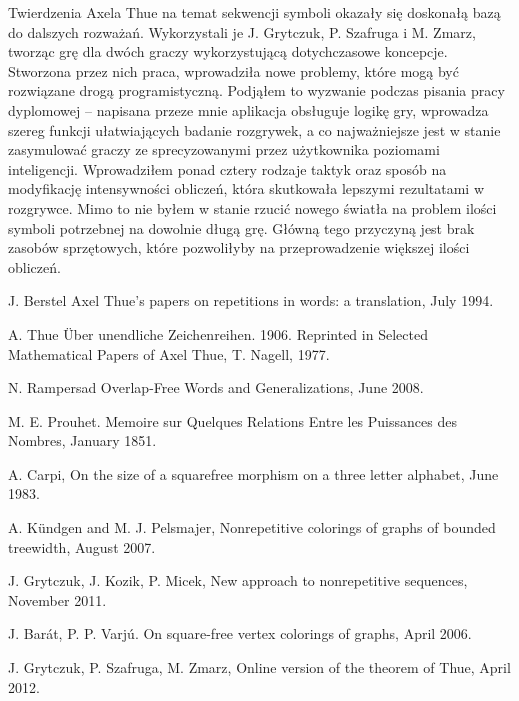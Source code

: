 \documentclass[document]{xmgr}
\begin{document}
\summary
Twierdzenia Axela Thue na temat sekwencji symboli okazały się doskonałą bazą do dalszych rozważań. Wykorzystali je J. Grytczuk, P. Szafruga i M. Zmarz, tworząc grę dla dwóch graczy wykorzystującą dotychczasowe koncepcje. Stworzona przez nich praca, wprowadziła nowe problemy, które mogą być rozwiązane drogą programistyczną. Podjąłem to wyzwanie podczas pisania pracy dyplomowej -- napisana przeze mnie aplikacja obsługuje logikę gry, wprowadza szereg funkcji ułatwiających badanie rozgrywek, a co najważniejsze jest w stanie zasymulować graczy ze sprecyzowanymi przez użytkownika poziomami inteligencji. Wprowadziłem ponad cztery rodzaje taktyk oraz sposób na modyfikację intensywności obliczeń, która skutkowała lepszymi rezultatami w rozgrywce. Mimo to nie byłem w stanie rzucić nowego światła na problem ilości symboli potrzebnej na dowolnie długą grę. Główną tego przyczyną jest brak zasobów sprzętowych, które pozwoliłyby na przeprowadzenie większej ilości obliczeń.

\appendix


\begin{thebibliography}{99}

 J. Berstel Axel Thue's papers on repetitions in words: a translation, July 1994.

 A. Thue Über unendliche Zeichenreihen. 1906. Reprinted in Selected Mathematical Papers of Axel Thue, T. Nagell, 1977.

 N. Rampersad Overlap-Free Words and Generalizations, June 2008.

 M. E. Prouhet. Memoire sur Quelques Relations Entre les Puissances des Nombres, January 1851.

 A. Carpi, On the size of a squarefree morphism on a three letter alphabet, June 1983.

 A. Kündgen and M. J. Pelsmajer, Nonrepetitive colorings of graphs of bounded treewidth, August 2007.

 J. Grytczuk, J. Kozik, P. Micek, New approach to nonrepetitive sequences, November 2011.

 J. Barát, P. P. Varjú. On square-free vertex colorings of graphs, April 2006.

 J. Grytczuk, P. Szafruga, M. Zmarz, Online version of the theorem of Thue, April 2012.

\end{thebibliography}

\listoftables

\listoffigures

\oswiadczenie
\end{document}
